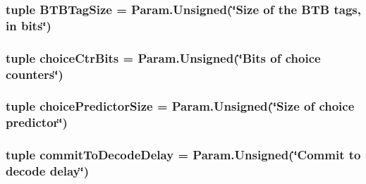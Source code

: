 \label{classSimpleOzoneCPU_1_1SimpleOzoneCPU_af08b7bde310be401d556775d6f7022c8}
\hypertarget{classSimpleOzoneCPU_1_1SimpleOzoneCPU_ad8cca86a44213bc6d3bd04b3447079d8}{
\subsubsection[{BTBTagSize}]{\setlength{\rightskip}{0pt plus 5cm}tuple {\bf BTBTagSize} = Param.Unsigned(\char`\"{}Size of the BTB tags, in bits\char`\"{})}}
\label{classSimpleOzoneCPU_1_1SimpleOzoneCPU_ad8cca86a44213bc6d3bd04b3447079d8}
\hypertarget{classSimpleOzoneCPU_1_1SimpleOzoneCPU_ae5455b064804378b4ec6f8094452896d}{
\subsubsection[{choiceCtrBits}]{\setlength{\rightskip}{0pt plus 5cm}tuple {\bf choiceCtrBits} = Param.Unsigned(\char`\"{}Bits of choice counters\char`\"{})}}
\label{classSimpleOzoneCPU_1_1SimpleOzoneCPU_ae5455b064804378b4ec6f8094452896d}
\hypertarget{classSimpleOzoneCPU_1_1SimpleOzoneCPU_acd59ddeaa888aee8a086f93d0ce0afbc}{
\subsubsection[{choicePredictorSize}]{\setlength{\rightskip}{0pt plus 5cm}tuple {\bf choicePredictorSize} = Param.Unsigned(\char`\"{}Size of choice predictor\char`\"{})}}
\label{classSimpleOzoneCPU_1_1SimpleOzoneCPU_acd59ddeaa888aee8a086f93d0ce0afbc}
\hypertarget{classSimpleOzoneCPU_1_1SimpleOzoneCPU_acaab18e678264ee264642b5be0d91157}{
\subsubsection[{commitToDecodeDelay}]{\setlength{\rightskip}{0pt plus 5cm}tuple {\bf commitToDecodeDelay} = Param.Unsigned(\char`\"{}Commit to decode delay\char`\"{})}}
